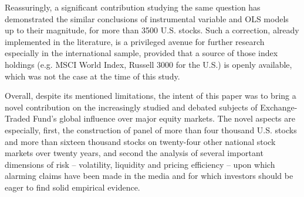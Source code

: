 Reassuringly, a significant contribution studying the same question \parencite{Ben-David2018} has demonstrated the similar conclusions of instrumental variable and OLS models up to their magnitude, for more than 3500 U.S. stocks. Such a correction, already implemented in the literature, is a privileged avenue for further research especially in the international sample, provided that a source of those index holdings (e.g. MSCI World Index, Russell 3000 for the U.S.) is openly available, which was not the case at the time of this study.

Overall, despite its mentioned limitations, the intent of this paper was to bring a novel contribution on the increasingly studied and debated subjects of Exchange-Traded Fund's global influence over major equity markets. The novel aspects are especially, first, the construction of panel of more than four thousand U.S. stocks and more than sixteen thousand stocks on twenty-four other national stock markets over twenty years, and second the analysis of several important dimensions of risk -- volatility, liquidity and pricing efficiency -- upon which alarming claims have been made in the media and for which investors should be eager to find solid empirical evidence.
